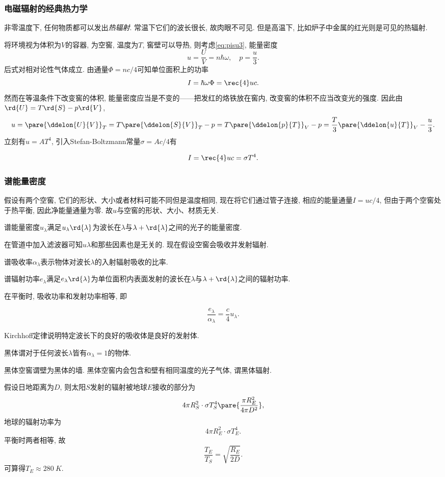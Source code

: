 \documentclass[../Thermal.tex]{subfiles}
\begin{document}
\subsubsection{电磁辐射的经典热力学}
非零温度下, 任何物质都可以发出\emph{热辐射}. 常温下它们的波长很长, 故肉眼不可见. 但是高温下, 比如炉子中金属的红光则是可见的热辐射.
\par
将环境视为体积为$V$的容器, 为空窖, 温度为$T$, 窖壁可以导热, 则考虑\eqref{eq:pisu3}, 能量密度
\[ u = \frac{U}{V} = n\hbar\omega, \quad p = \frac{u}{3}. \]
后式对相对论性气体成立. 由通量$\Phi = nc/4$可知单位面积上的功率
\[ I = \hbar \omega \Phi = \rec{4}uc. \]
然而在等温条件下改变窖的体积, 能量密度应当是不变的——把发红的烙铁放在窖内, 改变窖的体积不应当改变光的强度. 因此由$\rd{U} = T\rd{S} - p\rd{V}$,
\[ u = \pare{\ddelon{U}{V}}_T = T\pare{\ddelon{S}{V}}_T - p = T\pare{\ddelon{p}{T}}_V - p = \frac{T}{3}\pare{\ddelon{u}{T}}_V - \frac{u}{3}. \]
立刻有$u=AT^4$, 引入Stefan-Boltzmann常量$\sigma = Ac/4$有
\begin{finale}
\[ I = \rec{4}uc = \sigma T^4. \]
\end{finale}
\subsubsection{谱能量密度}
假设有两个空窖, 它们的形状、大小或者材料可能不同但是温度相同, 现在将它们通过管子连接, 相应的能量通量$I = uc/4$, 但由于两个空窖处于热平衡, 因此净能量通量为零. 故$u$与空窖的形状、大小、材质无关.
\begin{definition}[谱能量密度]
谱能量密度$u_\lambda$满足$u_\lambda \rd{\lambda}$为波长在$\lambda$与$\lambda+\rd{\lambda}$之间的光子的能量密度.
\end{definition}
在管道中加入滤波器可知$u\lambda$和那些因素也是无关的. 现在假设空窖会吸收并发射辐射.
\begin{definition}[谱吸收率]
谱吸收率$\alpha_\lambda$表示物体对波长$\lambda$的入射辐射吸收的比率.
\end{definition}
\begin{definition}[谱辐射功率]
谱辐射功率$e_\lambda$满足$e_\lambda \rd{\lambda}$为单位面积内表面发射的波长在$\lambda$与$\lambda+\rd{\lambda}$之间的辐射功率.
\end{definition}
在平衡时, 吸收功率和发射功率相等, 即
\begin{corollary}[Kirchhoff定律]
\[ \frac{e_\lambda}{\alpha_\lambda} = \frac{c}{4}u_\lambda. \]
\end{corollary}
\begin{remark}
Kirchhoff定律说明特定波长下的良好的吸收体是良好的发射体.
\end{remark}
\begin{definition}[黑体]
黑体谓对于任何波长$\lambda$皆有$\alpha_\lambda=1$的物体.
\end{definition}
\begin{definition}[黑体空窖与黑体辐射]
黑体空窖谓壁为黑体的墙. 黑体空窖内会包含和壁有相同温度的光子气体, 谓黑体辐射.
\end{definition}
假设日地距离为$D$, 则太阳$S$发射的辐射被地球$E$接收的部分为
\[ 4\pi R_{S}^2\cdot \sigma T_{S}^4\pare{\frac{\pi R_{E}^2}{4\pi D^2}}, \]
地球的辐射功率为
\[ 4\pi R_{E}^2\cdot \sigma T_{E}^4. \]
平衡时两者相等, 故
\[ \frac{T_{E}}{T_{S}} = \sqrt{\frac{R_{E}}{2D}}. \]
可算得$T_{E}\approx\SI{280}{K}.$
\end{document}
